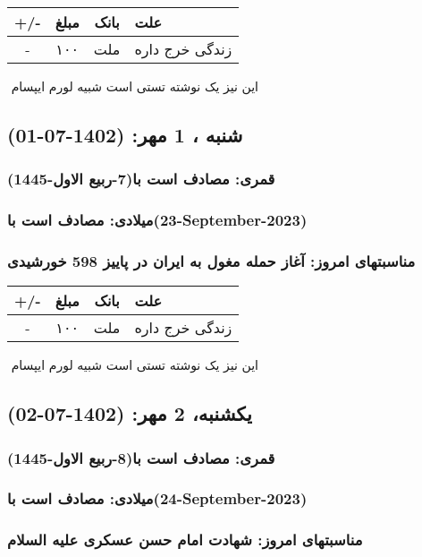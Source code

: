 \documentclass{article}
\newcommand{\rnote}[1]{\marginpar{\textcolor{color}{\StrSubstitute{\##1}{ }{\_}}}}
\newcommand{\myRow}[4]{
    #1 & #2 & #3 & #4 \\ \hline
}
\begin{document}
\begin{tabular}{ | c | c | c | p{5cm} |}
    \hline
    \myRow{ +/- }{مبلغ}{بانک}{علت}
    \myRow{-}{۱۰۰}{ملت}{زندگی خرج داره}
\end{tabular}
\newline
\newline

‌
\rnote{تست}
این نیز یک نوشته تستی است شبیه لورم ایپسام




\newpage
{}
\textcolor{color}{
\section{ شنبه ، 1 مهر: (1402-07-01) }
\subsubsection*{قمری: مصادف است با(7-ربیع الاول-1445)} 
\subsubsection*{میلادی: مصادف است با(23-September-2023)}
\subsubsection*{مناسبتهای امروز: آغاز حمله مغول به ایران در پاییز 598 خورشیدی}
}


\begin{tabular}{ | c | c | c | p{5cm} |}
    \hline
    \myRow{ +/- }{مبلغ}{بانک}{علت}
    \myRow{-}{۱۰۰}{ملت}{زندگی خرج داره}
\end{tabular}
\newline
\newline

‌
\rnote{تست}
این نیز یک نوشته تستی است شبیه لورم ایپسام




\newpage
{}
\textcolor{color}{
\section{ یکشنبه، 2 مهر: (1402-07-02) }
\subsubsection*{قمری: مصادف است با(8-ربیع الاول-1445)} 
\subsubsection*{میلادی: مصادف است با(24-September-2023)}
\subsubsection*{مناسبتهای امروز: شهادت امام حسن عسکری علیه السلام}
}
\end{document}
